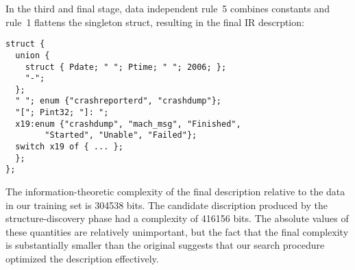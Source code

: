 

In the third and final stage, 
data independent rule~5 combines constants 
and rule~1 flattens the singleton struct, resulting in the final IR
descrption:

{\small
\begin{verbatim}
struct {
  union {
    struct { Pdate; " "; Ptime; " "; 2006; };
    "-";
  };
  " "; enum {"crashreporterd", "crashdump"};
  "["; Pint32; "]: ";
  x19:enum {"crashdump", "mach_msg", "Finished", 
        "Started", "Unable", "Failed"};
  switch x19 of { ... };
  };
};
\end{verbatim}
}

The information-theoretic complexity of the final description 
relative to the data in our training set is 304538 bits. 
The candidate discription produced by the structure-discovery phase
had a complexity of 416156 bits.  The absolute values of these quantities
are relatively unimportant, but the fact that the final complexity
is substantially smaller than the original suggests that our search
procedure optimized the description effectively.



